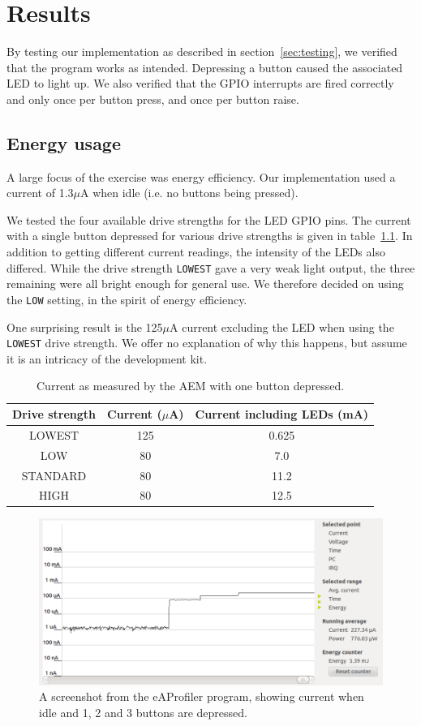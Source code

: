 \chapter{Results}
By testing our implementation as described in section~\ref{sec:testing}, we verified that the program works as intended. Depressing a button caused the associated LED to light up. We also verified that the GPIO interrupts are fired correctly and only once per button press, and once per button raise.

\section{Energy usage}
A large focus of the exercise was energy efficiency. Our implementation used a current of 1.3$\mu$A when idle (i.e. no buttons being pressed).

We tested the four available drive strengths for the LED GPIO pins. The current with a single button depressed for various drive strengths is given in table~\ref{tbl:current}. In addition to getting different current readings, the intensity of the LEDs also differed. While the drive strength \texttt{LOWEST} gave a very weak light output, the three remaining were all bright enough for general use. We therefore decided on using the \texttt{LOW} setting, in the spirit of energy efficiency.

One surprising result is the 125$\mu$A current excluding the LED when using the \texttt{LOWEST} drive strength. We offer no explanation of why this happens, but assume it is an intricacy of the development kit.

\begin{table}
\centering
\begin{tabular}{ c c c }
  Drive strength & Current ($\mu$A) & Current including LEDs (mA) \\
  \hline
  LOWEST & 125 & 0.625 \\
  LOW & 80 & 7.0 \\
  STANDARD & 80 & 11.2 \\
  HIGH & 80 & 12.5
\end{tabular}
\caption{Current as measured by the AEM with one button depressed.}
\label{tbl:current}
\end{table}

\begin{figure}
\centering
\includegraphics[width=\textwidth]{images/eaprofiler.png}
\caption{A screenshot from the eAProfiler program, showing current when idle and 1, 2 and 3 buttons are depressed.}
\end{figure}